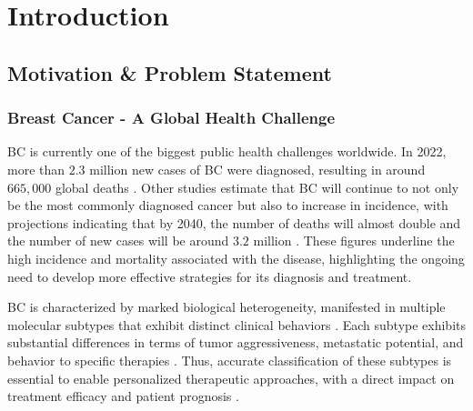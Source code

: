 
%

\chapter{Introduction}
\label{cha:introduction}

\section{Motivation \& Problem Statement}
\label{sec:motivation+problem-statement}
\subsection{Breast Cancer - A Global Health Challenge}
\gls{BC} is currently one of the biggest public health challenges worldwide. In 2022,
more than $2.3$ million new cases of \gls{BC} were diagnosed, resulting in around $665,\!000$ global deaths
\textcite{bcaData2024_bray}. Other studies estimate that \gls{BC} will continue to not only be
the most commonly diagnosed cancer but also to increase in incidence, with projections indicating that by 2040, the number
of deaths will almost double and the number of new cases will be around $3.2$ million \textcite{bca_data_Arnold2022Current}.
These figures underline the high incidence and mortality associated with the disease, highlighting the ongoing need to
develop more effective strategies for its diagnosis and treatment.


BC is characterized by marked biological heterogeneity, manifested in multiple
molecular subtypes that exhibit distinct clinical behaviors
\textcite{bc_molecular_Perou2000}. Each subtype exhibits substantial
differences in terms of tumor aggressiveness, metastatic potential, and
behavior to specific therapies \textcite{bc_subtypes_Prat2015Clinical}. Thus,
accurate classification of these subtypes is essential to enable personalized
therapeutic approaches, with a direct impact on treatment efficacy and patient
prognosis \textcite{need_for_subtype_treatments_Testa2020Breast}.

